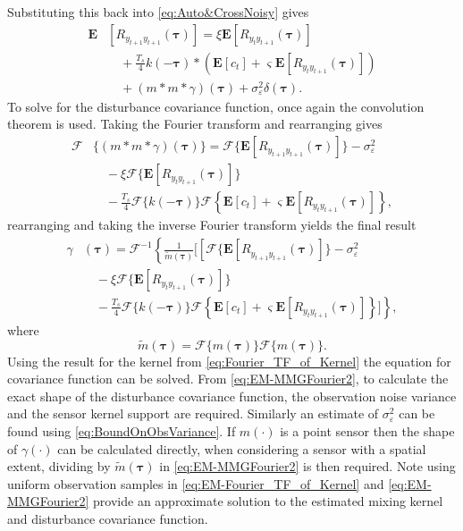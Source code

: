 \documentclass[10pt,twocolumn,twoside]{IEEEtran}
\begin{document}
Substituting this back into \eqref{eq:Auto&CrossNoisy}  gives
\begin{align}
	\mathbf{E}&[R_{y_{t+1}y_{t+1}}(\boldsymbol{\tau})] = \xi \mathbf{E}[R_{y_ty_{t+1}}(\boldsymbol{\tau})] \nonumber \\
	&\quad+  \frac{T_s}{4} k(-\boldsymbol\tau) \ast (\mathbf{E}\left[c_t\right] + \varsigma \mathbf{E}\left[R_{y_ty_{t+1}}(\boldsymbol\tau)\right] ) \nonumber \\
	&\quad+(m\ast m \ast \gamma)(\boldsymbol\tau)+\sigma_{\varepsilon}^2\delta(\boldsymbol{\tau}).
\end{align}
To solve for the disturbance covariance function, once again the convolution theorem is used. Taking the Fourier transform and rearranging gives
\begin{align}
	\mathcal{F}&\{(m\ast m \ast \gamma)(\boldsymbol\tau)\} = \mathcal{F}\{\mathbf{E}[R_{y_{t+1}y_{t+1}}(\boldsymbol{\tau})]\}-\sigma_{\varepsilon}^2 \nonumber \\ 
	&\quad-\xi \mathcal{F}\{\mathbf{E}[R_{y_ty_{t+1}}(\boldsymbol{\tau})]\} \nonumber \\
	&\quad - \frac{T_s}{4} \mathcal{F}\{k(-\boldsymbol\tau)\}\mathcal{F}\left\{\mathbf{E}\left[c_t\right] + \varsigma \mathbf{E}\left[R_{y_ty_{t+1}}(\boldsymbol\tau)\right] \right\},
\end{align}
 rearranging and taking the inverse Fourier transform yields the final result 
 \begin{align}\label{eq:EM-MMGFourier2}   
	\gamma&(\boldsymbol\tau) =\mathcal{F}^{-1}\left\lbrace\frac{1}{\tilde{m}(\boldsymbol\tau)}\Bigg[\left[ \mathcal{F}\{\mathbf{E}[R_{y_{t+1}y_{t+1}}(\boldsymbol{\tau})]\}-\sigma_{\varepsilon}^2  \nonumber \right. \right. \\ 
	&\quad-\xi \mathcal{F}\{\mathbf{E}[R_{y_ty_{t+1}}(\boldsymbol{\tau})]\} \nonumber \\
	&\left.\quad - \frac{T_s}{4} \mathcal{F}\{k(-\boldsymbol\tau)\}\mathcal{F}\left\{\mathbf{E}\left[c_t\right] + \varsigma \mathbf{E}\left[R_{y_ty_{t+1}}(\boldsymbol\tau)\right] \right\}\Bigg]\right\rbrace,
\end{align}
where
\begin{equation}
 \tilde{m}(\boldsymbol\tau)=\mathcal{F}\{m(\boldsymbol\tau)\}\mathcal{F}\{m(\boldsymbol\tau)\}.
\end{equation}
Using the result for the kernel from  \eqref{eq:Fourier_TF_of_Kernel}  the equation for covariance function can be solved. From \eqref{eq:EM-MMGFourier2}, to calculate the exact shape of the disturbance covariance function, the observation noise variance and the sensor kernel support are required. Similarly an estimate  of $\sigma_{\varepsilon}^2$ can be found using \eqref{eq:BoundOnObsVariance}. If $m(\cdot)$ is a point sensor then the shape of $\gamma(\cdot)$ can be calculated directly, when considering a sensor with a spatial extent, dividing by $\tilde{m}(\boldsymbol\tau)$ in \eqref{eq:EM-MMGFourier2} is then required. 
Note using uniform observation samples in \eqref{eq:EM-Fourier_TF_of_Kernel}  and \eqref{eq:EM-MMGFourier2} provide an approximate solution to the estimated  mixing kernel and disturbance covariance function.
\end{document}
